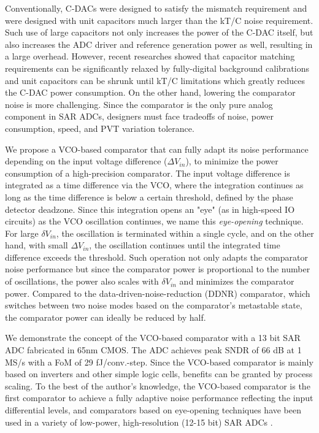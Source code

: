 \documentclass[letterpaper, 10 pt, conference]{ieeeconf}  %
\begin{document}
Conventionally, C-DACs were designed to satisfy the mismatch requirement and were designed with unit capacitors much larger than the kT/C noise requirement. Such use of large capacitors not only increases the power of the C-DAC itself, but also increases the  ADC driver and reference generation power as well, resulting in a large overhead. However, recent researches showed that capacitor matching requirements can be significantly relaxed by fully-digital background calibrations \cite{liu201012b,liu201112,mcneill2011all,mcneill2005split} and unit capacitors can be shrunk until kT/C limitations which greatly reduces the C-DAC power consumption. 
On the other hand, lowering the comparator noise is more challenging. Since the comparator is the only pure analog component in SAR ADCs, designers must face tradeoffs of noise, power consumption, speed, and PVT variation tolerance.

We propose a VCO-based comparator that can fully adapt its noise performance depending on the input voltage difference ($\Delta V_{in}$), to minimize the power consumption of a high-precision comparator\cite{yoshioka201413b}. The input voltage difference is integrated as a time difference via the VCO, where the integration continues as long as the time difference is below a certain threshold, defined by the phase detector deadzone. Since this integration opens an "eye" (as in high-speed IO circuits) as the VCO oscillation continues, we name this \textit{eye-opening} technique. For large $\delta V_{in}$, the oscillation is terminated within a single cycle, and on the other hand, with small $\Delta V_{in}$, the oscillation continues until the integrated time difference exceeds the threshold. Such operation not only adapts the comparator noise performance but since the comparator power is proportional to the number of oscillations, the power also scales with $\delta V_{in}$ and minimizes the comparator power.
Compared to the data-driven-noise-reduction (DDNR) comparator\cite{harpe201310b}, which switches between two noise modes based on the comparator's metastable state, the comparator power can ideally be reduced by half.

We demonstrate the concept of the VCO-based comparator with a 13 bit SAR ADC fabricated in 65nm CMOS. The ADC achieves peak SNDR of 66 dB at 1 MS/s with a FoM of 29 fJ/conv.-step. Since the VCO-based comparator is mainly based on inverters and other simple logic cells, benefits can be granted by process scaling.
To the best of the author's knowledge, the VCO-based comparator is the first comparator to achieve a fully adaptive noise performance reflecting the input differential levels, and comparators based on eye-opening techniques have been used in a variety of low-power, high-resolution (12-15 bit) SAR ADCs \cite{ding20190, luo2020input, hsieh20180, li2019design, li202065, almarashli2017nyquist, shim2017edge, zhu201914, pan202012, lee2019fast, vogelmann2020efficient}.
\end{document}
